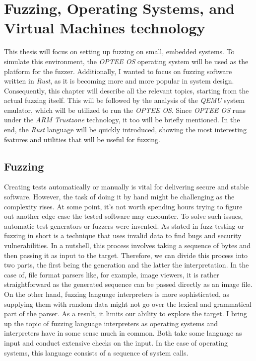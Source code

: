 \cleardoublepage

\section{Fuzzing, Operating Systems, and Virtual Machines technology} \label{chap:theory}

This thesis will focus on setting up fuzzing on small, embedded systems. To simulate this environment, the \textit{OPTEE OS} operating system will be used as the platform for the fuzzer. Additionally, I wanted to focus on fuzzing software written in \textit{Rust}, as it is becoming more and more popular in system design. Consequently, this chapter will describe all the relevant topics, starting from the actual fuzzing itself. This will be followed by the analysis of the \textit{QEMU} system emulator, which will be utilized to run the \textit{OPTEE OS}. Since \textit{OPTEE OS} runs under the \textit{ARM Trustzone} technology, it too will be briefly mentioned. In the end, the \textit{Rust} language will be quickly introduced, showing the most interesting features and utilities that will be useful for fuzzing.

\subsection{Fuzzing} 

Creating tests automatically or manually is vital for delivering secure and stable software. However, the task of doing it by hand might be challenging as the complexity rises. At some point, it's not worth spending hours trying to figure out another edge case the tested software may encounter. To solve such issues, automatic test generators or fuzzers were invented. As stated in \cite{fuzzing_state_of_art} fuzz testing or fuzzing in short is a technique that uses invalid data to find bugs and security vulnerabilities. In a nutshell, this process involves taking a sequence of bytes and then passing it as input to the target. Therefore, we can divide this process into two parts, the first being the generation and the latter the interpretation. In the case of, file format parsers like, for example, image viewers, it is rather straightforward as the generated sequence can be passed directly as an image file. On the other hand, fuzzing language interpreters is more sophisticated, as supplying them with random data might not go over the lexical and grammatical part of the parser. As a result, it limits our ability to explore the target. I bring up the topic of fuzzing language interpreters as operating systems and interpreters have in some sense much in common. Both take some language as input and conduct extensive checks on the input. In the case of operating systems, this language consists of a sequence of system calls.


